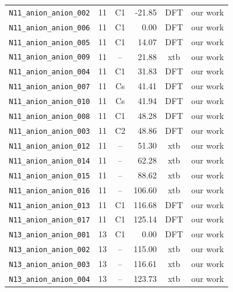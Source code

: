 {\begin{longtable}{@{}p{4.7cm}ccrcp{1.6cm}@{}}
\texttt{N11\_anion\_anion\_002} & 11 & C1 & -21.85 & DFT & our work \\
\texttt{N11\_anion\_anion\_006} & 11 & C1 & 0.00 & DFT & our work \\
\texttt{N11\_anion\_anion\_005} & 11 & C1 & 14.07 & DFT & our work \\
\texttt{N11\_anion\_anion\_009} & 11 & -- & 21.88 & xtb & our work \\
\texttt{N11\_anion\_anion\_004} & 11 & C1 & 31.83 & DFT & our work \\
\texttt{N11\_anion\_anion\_007} & 11 & Cs & 41.41 & DFT & our work \\
\texttt{N11\_anion\_anion\_010} & 11 & Cs & 41.94 & DFT & our work \\
\texttt{N11\_anion\_anion\_008} & 11 & C1 & 48.28 & DFT & our work \\
\texttt{N11\_anion\_anion\_003} & 11 & C2 & 48.86 & DFT & our work \\
\texttt{N11\_anion\_anion\_012} & 11 & -- & 51.30 & xtb & our work \\
\texttt{N11\_anion\_anion\_014} & 11 & -- & 62.28 & xtb & our work \\
\texttt{N11\_anion\_anion\_015} & 11 & -- & 88.62 & xtb & our work \\
\texttt{N11\_anion\_anion\_016} & 11 & -- & 106.60 & xtb & our work \\
\texttt{N11\_anion\_anion\_013} & 11 & C1 & 116.68 & DFT & our work \\
\texttt{N11\_anion\_anion\_017} & 11 & C1 & 125.14 & DFT & our work \\
\addlinespace
\texttt{N13\_anion\_anion\_001} & 13 & C1 & 0.00 & DFT & our work \\
\texttt{N13\_anion\_anion\_002} & 13 & -- & 115.00 & xtb & our work \\
\texttt{N13\_anion\_anion\_003} & 13 & -- & 116.61 & xtb & our work \\
\texttt{N13\_anion\_anion\_004} & 13 & -- & 123.73 & xtb & our work \\
\end{longtable}
}
